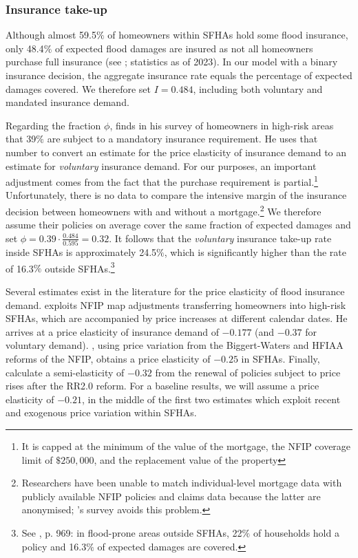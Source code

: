 \documentclass[12pt]{article}
\begin{document}
\subsubsection{Insurance take-up}
Although almost 59.5$\%$ of homeowners within SFHAs hold some flood insurance, only 48.4$\%$ of expected flood damages are insured as not all homeowners purchase full insurance (see \cite{amornsiripanitch2025measuring}; statistics as of 2023). In our model with a binary insurance decision, the aggregate insurance rate equals the percentage of expected damages covered. We therefore set $I=0.484$, including both voluntary and mandated insurance demand. 

Regarding the fraction $\phi$, \cite{mulder2024mismeasuring} finds in his survey of homeowners in high-risk areas that 39$\%$ are subject to a mandatory insurance requirement. He uses that number to convert an estimate for the price elasticity of insurance demand to an estimate for \textit{voluntary} insurance demand. For our purposes, an important adjustment comes from the fact that the purchase requirement is partial.\footnote{It is capped at the minimum of the value of the mortgage, the NFIP coverage limit of $\$250,000$, and the replacement value of the property} Unfortunately, there is no data to compare the intensive margin of the insurance decision between homeowners with and without a mortgage.\footnote{Researchers have been unable to match individual-level mortgage data with publicly available NFIP policies and claims data because the latter are anonymised; \cite{mulder2024mismeasuring}'s survey avoids this problem.} We therefore assume their policies on average cover the same fraction of expected damages and set $\phi=0.39\cdot\frac{0.484}{0.595}=0.32$. It follows that the \textit{voluntary} insurance take-up rate inside SFHAs is approximately 24.5$\%$, which is significantly higher than the rate of 16.3$\%$ outside SFHAs.\footnote{See \cite{amornsiripanitch2025measuring}, p. 969: in flood-prone areas outside SFHAs, 22$\%$ of households hold a policy and 16.3$\%$ of expected damages are covered.}    

Several estimates exist in the literature for the price elasticity of flood insurance demand. \cite{mulder2024mismeasuring} exploits NFIP map adjustments transferring homeowners into high-risk SFHAs, which are accompanied by price increases at different calendar dates. He arrives at a price elasticity of insurance demand of $-0.177$ (and $-0.37$ for voluntary demand). \cite{wagner2022adaptation}, using price variation from the Biggert-Waters and HFIAA reforms of the NFIP, obtains a price elasticity of $-0.25$ in SFHAs. Finally, \cite{gruber2026optimal} calculate a semi-elasticity of $-0.32$ from the renewal of policies subject to price rises after the RR2.0 reform. For a baseline results, we will assume a price elasticity of $-0.21$, in the middle of the first two estimates which exploit recent and exogenous price variation within SFHAs.         
\end{document}
